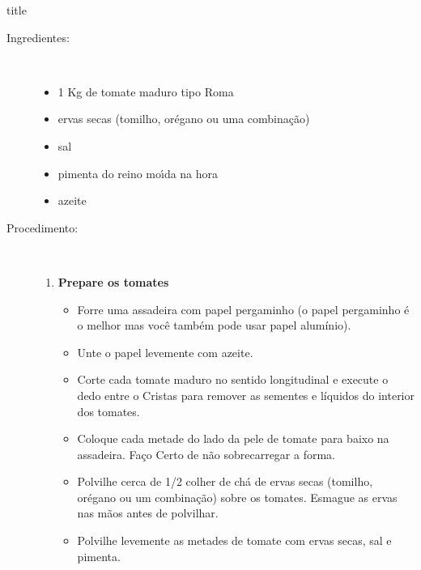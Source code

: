 \documentclass [11pt, letterpaper] {article}
\begin{document}
 {title}
 
\begin {description}

\item [Ingredientes:] \ \\
\begin {itemize}
\item 1 Kg de tomate maduro tipo Roma
\item ervas secas (tomilho, orégano ou uma combinação)
\item sal
\item pimenta do reino mo\'{\i}da na hora
\item azeite
\end {itemize}

\item [Procedimento:] \ \\
\begin {enumerate}
\item {\bf Prepare os tomates}
\begin {itemize}
\item Forre uma assadeira com papel pergaminho (o papel pergaminho é o melhor
   mas você também pode usar papel alumínio).
\item Unte o papel levemente com azeite.
\item Corte cada tomate maduro no sentido longitudinal e execute o dedo entre o
   Cristas para remover as sementes e líquidos do interior dos tomates.
\item Coloque cada metade do lado da pele de tomate para baixo na assadeira. Faço
   Certo de não sobrecarregar a forma.
\item Polvilhe cerca de 1/2 colher de chá de ervas secas (tomilho, orégano ou um
   combinação) sobre os tomates. Esmague as ervas nas mãos antes de polvilhar.
\item Polvilhe levemente as metades de tomate com ervas secas, sal e pimenta.
\end {itemize}


\end{enumerate}
\end{description}
\end{document}
